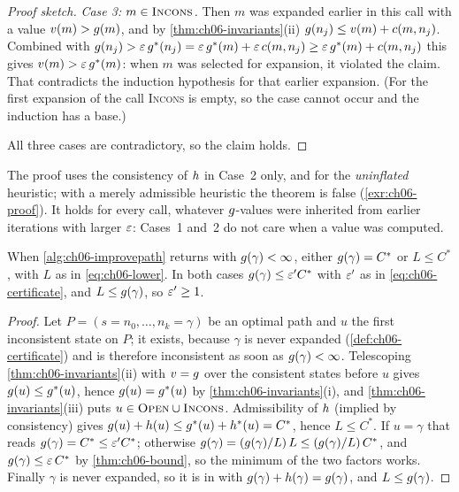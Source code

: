 \begin{proof}[Proof sketch]
\emph{Case 3: $m \in \textsc{Incons}$.} Then $m$ was expanded earlier in this
call with a value $v(m) > g(m)$, and by \cref{thm:ch06-invariants}(ii)
$g(n_j) \le v(m) + c(m, n_j)$. Combined with $g(n_j) > \varepsilon\,
g^*(n_j) = \varepsilon\,g^*(m) + \varepsilon\,c(m, n_j) \ge \varepsilon\,g^*(m) +
c(m, n_j)$ this gives $v(m) > \varepsilon\,g^*(m)$: when $m$ was selected for
expansion, it violated the claim. That contradicts the induction hypothesis
for that earlier expansion. (For the first expansion of the call
\textsc{Incons} is empty, so the case cannot occur and the induction has a
base.)

All three cases are contradictory, so the claim holds.
\end{proof}

The proof uses the consistency of $h$ in Case~2 only, and for the
\emph{uninflated} heuristic; with a merely admissible heuristic the theorem is
false (\cref{exr:ch06-proof}). It holds for every call, whatever
$g$-values were inherited from earlier iterations with larger $\varepsilon$:
Cases~1 and~2 do not care when a value was computed.

\begin{proposition}
\label{thm:ch06-certificate}
When \cref{alg:ch06-improvepath} returns with $g(\gamma) < \infty$,
either $g(\gamma) = C^*$ or $L \le C^*$, with $L$ as in
\cref{eq:ch06-lower}. In both cases $g(\gamma) \le \varepsilon' C^*$ with
$\varepsilon'$ as in \cref{eq:ch06-certificate}, and $L \le g(\gamma)$, so
$\varepsilon' \ge 1$.
\end{proposition}
\begin{proof}
Let $P = (s = n_0, \dots, n_k = \gamma)$ be an optimal path and $u$ the first
inconsistent state on $P$; it exists, because $\gamma$ is never expanded
(\cref{def:ch06-certificate}) and is therefore inconsistent as soon as
$g(\gamma) < \infty$. Telescoping \cref{thm:ch06-invariants}(ii) with
$v = g$ over the consistent states before $u$ gives $g(u) \le
g^*(u)$, hence $g(u) = g^*(u)$ by
\cref{thm:ch06-invariants}(i), and \cref{thm:ch06-invariants}(iii) puts
$u \in \textsc{Open} \cup \textsc{Incons}$. Admissibility of $h$ (implied by
consistency) gives $g(u) + h(u) \le g^*(u) + h^*(u) =
C^*$, hence $L \le C^*$. If $u = \gamma$ that reads
$g(\gamma) = C^* \le \varepsilon' C^*$; otherwise
$g(\gamma) = (g(\gamma) / L)\,L \le (g(\gamma)/L)\,C^*$, and
$g(\gamma) \le \varepsilon\,C^*$ by \cref{thm:ch06-bound}, so the minimum of
the two factors works. Finally $\gamma$ is never expanded, so it is in
\Open with $g(\gamma) + h(\gamma) = g(\gamma)$, and $L \le
g(\gamma)$.
\end{proof}

